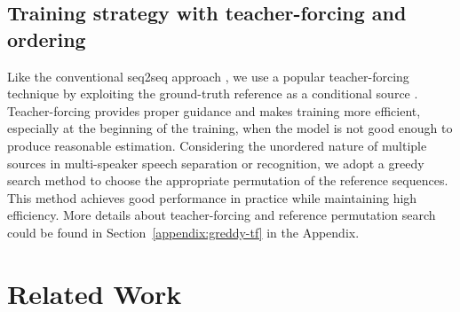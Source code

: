\documentclass{article}
\begin{document}
\subsection{Training strategy with teacher-forcing and ordering}\label{sec:greddy-tf}
Like the conventional seq2seq approach \cite{bahdanau2015neural}, we use a popular teacher-forcing \cite{Williams1989} technique by exploiting the ground-truth reference as a conditional source .
Teacher-forcing provides proper guidance and makes training more efficient, especially at the beginning of the training, when the model is not good enough to produce reasonable estimation.
Considering the unordered nature of multiple sources in multi-speaker speech separation or recognition, we adopt a greedy search method to choose the appropriate permutation of the reference sequences. This method achieves good performance in practice while maintaining high efficiency. More details about teacher-forcing and reference permutation search could be found in Section~\ref{appendix:greddy-tf} in the Appendix.

\section{Related Work}\label{sec:relate}
\end{document}
